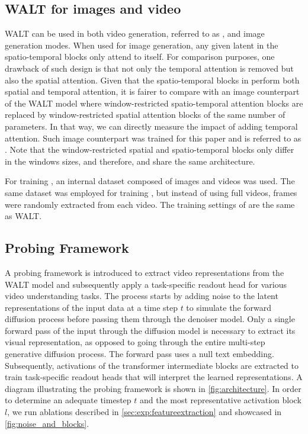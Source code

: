 \subsection{WALT for images and video}
\label{sec:method:walt_variants}
WALT can be used in both video generation, referred to as \vwalt, and image generation modes. When used for image generation, any given latent in the spatio-temporal blocks only attend to itself. For comparison purposes, one drawback of such design is that not only the temporal attention is removed but also the spatial attention. Given that the spatio-temporal blocks in \vwalt perform both spatial and temporal attention, it is fairer to compare with an image counterpart of the WALT model where window-restricted spatio-temporal attention blocks are replaced by window-restricted spatial attention blocks of the same number of parameters. In that way, we can directly measure the impact of adding temporal attention. Such image counterpart was trained for this paper and is referred to as \iwalt. Note that the window-restricted spatial and spatio-temporal blocks only differ in the windows sizes, and therefore, \iwalt and \vwalt share the same architecture.

For training \vwalt, an internal dataset composed of images and videos was used. The same dataset was employed for training \iwalt, but instead of using full videos, frames were randomly extracted from each video. The training settings of \iwalt are the same as WALT.

\subsection{Probing Framework}
\label{sec:method:probing_framework}


A probing framework is introduced to extract video representations from the WALT model and subsequently apply a task-specific readout head for various video understanding tasks. The process starts by adding noise to the latent representations of the input data at a time step $t$ to simulate the forward diffusion process before passing them through the denoiser model. Only a single forward pass of the input through the diffusion model is necessary to extract its visual representation, as opposed to going through the entire multi-step generative diffusion process. The forward pass uses a null text embedding. Subsequently, activations of the transformer intermediate blocks are extracted to train task-specific readout heads that will interpret the learned representations. A diagram illustrating the probing framework is shown in \cref{fig:architecture}.
In order to determine an adequate timestep $t$ and the most representative activation block $l$, we run ablations described in \cref{sec:exp:featureextraction} and showcased in \cref{fig:noise_and_blocks}.




